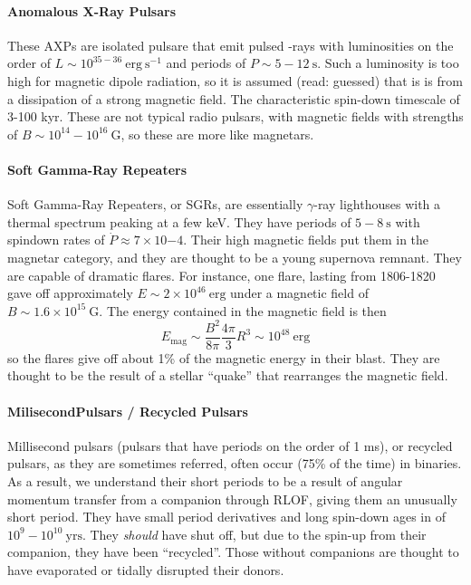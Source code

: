 \documentclass[10pt]{article}
\numberwithin{equation}{section}
\begin{document}
	\paragraph{Anomalous X-Ray Pulsars} %
	\label{par:anomalous_x_ray_pulsars}
	 These AXPs are isolated pulsare that emit pulsed -rays with luminosities on the order of $L\sim 10^{35-36}\ \mathrm{erg\ s^{-1}}$ and periods of $P\sim 5-12\ \mathrm{s}$. Such a luminosity is too high for magnetic dipole radiation, so it is assumed (read: guessed) that is is from a dissipation of a strong magnetic field. The characteristic spin-down timescale of 3-100 kyr. These are not typical radio pulsars, with magnetic fields with strengths of $B\sim 10^{14}-10^{16}\ \mathrm{G}$, so these are more like magnetars. 
	\paragraph{Soft Gamma-Ray Repeaters} %
	\label{par:soft_gamma_ray_repeaters}
		Soft Gamma-Ray Repeaters, or SGRs, are essentially $\gamma$-ray lighthouses with a thermal spectrum peaking at a few keV. They have periods of $5-8\ \mathrm{s}$ with spindown rates of $\dot{P}\approx 7\times 10{-4}$. Their high magnetic fields put them in the magnetar category, and they are thought to be a young supernova remnant. They are capable of dramatic flares. For instance, one flare, lasting from 1806-1820 gave off approximately $E\sim 2\times 10^{46}\ \mathrm{erg}$ under a magnetic field of $B\sim 1.6\times 10^{15}\ \mathrm{G}$. The energy contained in the magnetic field is then
		\begin{equation}
			\label{eq:SGR:1} E_{\mathrm{mag}} \sim \frac{B^2}{8\pi}\frac{4\pi}{3} R^3 \sim 10^{48}\ \mathrm{erg}
		\end{equation}
		so the flares give off about 1\% of the magnetic energy in their blast. They are thought to be the result of a stellar ``quake'' that rearranges the magnetic field.
	\paragraph{MilisecondPulsars / Recycled Pulsars} %
	\label{par:milisecondpulsars_recycled_pulsars}
	Millisecond pulsars (pulsars that have periods on the order of 1 ms), or recycled pulsars, as they are sometimes referred, often occur (75\% of the time) in binaries. As a result, we understand their short periods to be a result of angular momentum transfer from a companion through RLOF, giving them an unusually short period. They have small period derivatives and long spin-down ages in of $10^9-10^{10}\ \mathrm{yrs}$. They \emph{should} have shut off, but due to the spin-up from their companion, they have been ``recycled''. Those without companions are thought to have evaporated or tidally disrupted their donors.

\end{document}
